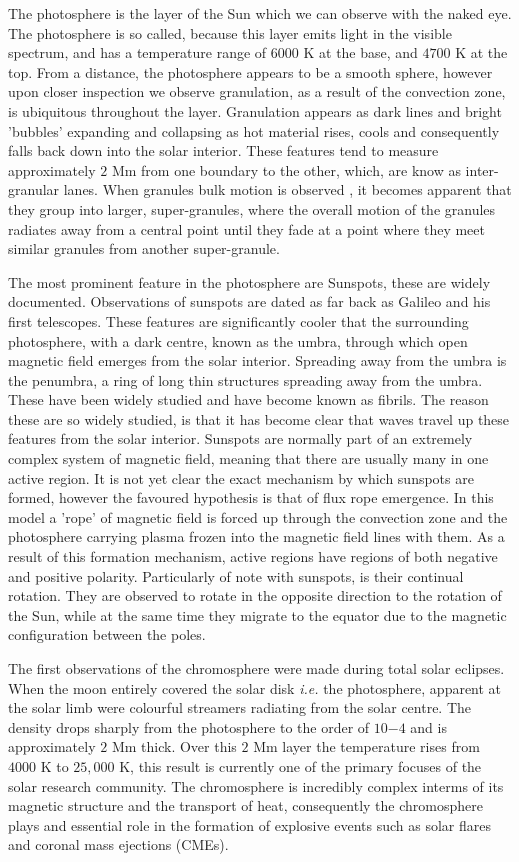 The photosphere is the layer of the Sun which we can observe with the naked eye.
The photosphere is so called, because this layer emits light in the visible spectrum, and has a temperature range of $6000$ K at the base, and $4700$ K at the top. 
From a distance, the photosphere appears to be a smooth sphere, however upon closer inspection we observe granulation, as a result of the convection zone, is ubiquitous throughout the layer.
Granulation appears as dark lines and bright 'bubbles' expanding and collapsing as hot material rises, cools and consequently falls back down into the solar interior.
These features tend to measure approximately $2$ Mm from one boundary to the other, which, are know as inter-granular lanes.
When granules bulk motion is observed , it becomes apparent that they group into larger, super-granules, where the overall motion of the granules radiates away from a central point until they fade at a point where they meet similar granules from another super-granule.

The most prominent feature in the photosphere are Sunspots, these are widely documented.
Observations of sunspots are dated as far back as Galileo and his first telescopes.
These features are significantly cooler that the surrounding photosphere, with a dark centre, known as the umbra, through which open magnetic field emerges from the solar interior.
Spreading away from the umbra is the penumbra, a ring of long thin structures spreading away from the umbra.
These have been widely studied and have become known as fibrils.
The reason these are so widely studied, is that it has become clear that waves travel up these features from the solar interior.
Sunspots are normally part of an extremely complex system of magnetic field, meaning that there are usually many in one active region.
It is not yet clear the exact mechanism by which sunspots are formed, however the favoured hypothesis is that of flux rope emergence.
In this model a 'rope' of magnetic field is forced up through the convection zone and the photosphere carrying plasma frozen into the magnetic field lines with them.
As a result of this formation mechanism, active regions have regions of both negative and positive polarity.
Particularly of note with sunspots, is their continual rotation.
They are observed to rotate in the opposite direction to the rotation of the Sun, while at the same time they migrate to the equator due to the magnetic configuration between the poles.


The first observations of the chromosphere were made during total solar eclipses.
When the moon entirely covered the solar disk \emph{i.e.} the photosphere, apparent at the solar limb were colourful streamers radiating from the solar centre.
The density drops sharply from the photosphere to the order of $10{-4}$ and is approximately $2$ Mm thick. 
Over this $2$ Mm layer the temperature rises from $4000$ K to $25,000$ K, this result is currently one of the primary focuses of the solar research community.
The chromosphere is incredibly complex interms of its magnetic structure and the transport of heat, consequently the chromosphere plays and essential role in the formation of explosive events such as solar flares and coronal mass ejections (CMEs).

